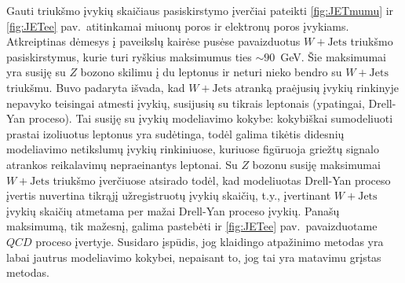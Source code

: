 \documentclass[a4paper, 12pt, oneside]{article}
\newcommand{\WJets}{W\! +\!\mathrm{Jets}}
\newcommand{\QCD}{QC\! D}
\begin{document}
Gauti triukšmo įvykių skaičiaus pasiskirstymo įverčiai pateikti \ref{fig:JETmumu} ir \ref{fig:JETee} pav.\ atitinkamai
miuonų poros ir elektronų poros įvykiams.
Atkreiptinas dėmesys į paveikslų kairėse pusėse pavaizduotus $\WJets$ triukšmo pasiskirstymus, kurie turi ryškius
maksimumus ties $\sim\!90$~GeV.
Šie maksimumai yra susiję su $Z$ bozono skilimu į du leptonus ir neturi nieko bendro su $\WJets$ triukšmu.
Buvo padaryta išvada, kad $\WJets$ atranką praėjusių įvykių rinkinyje nepavyko teisingai atmesti įvykių, susijusių
su tikrais leptonais (ypatingai, Drell-Yan proceso).
Tai susiję su įvykių modeliavimo kokybe: kokybiškai sumodeliuoti prastai izoliuotus leptonus yra sudėtinga, todėl galima
tikėtis didesnių modeliavimo netikslumų įvykių rinkiniuose, kuriuose figūruoja griežtų signalo atrankos reikalavimų nepraeinantys leptonai.
Su $Z$ bozonu susiję maksimumai $\WJets$ triukšmo įverčiuose atsirado todėl, kad modeliuotas Drell-Yan proceso įvertis
nuvertina tikrąjį užregistruotų įvykių skaičių, t.y., įvertinant $\WJets$ įvykių skaičių atmetama per mažai Drell-Yan proceso
įvykių.
Panašų maksimumą, tik mažesnį, galima pastebėti ir \ref{fig:JETee} pav.\ pavaizduotame $\QCD$ proceso įvertyje.
Susidaro įspūdis, jog klaidingo atpažinimo metodas yra labai jautrus modeliavimo kokybei, nepaisant to, jog tai yra matavimu grįstas metodas.
\end{document}
